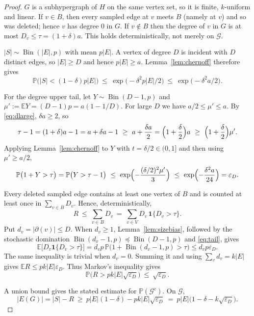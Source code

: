 \documentclass[11pt,a4paper]{amsart}
\theoremstyle{plain}
\theoremstyle{definition}
\theoremstyle{remark}
\newcommand{\VV}{V}
\newcommand{\EE}{E}
\newcommand{\PP}{\mathbb{P}}
\newcommand{\EX}{\mathbb{E}}
\newcommand{\Bin}{\operatorname{Bin}}
\newcommand{\dg}{\partial}
\begin{document}
\begin{proof}
$G$ is a subhypergraph of $H$ on the same vertex set, so it is finite, $k$-uniform and
linear. If $v\in B$, then every sampled edge at $v$ meets
$B$ (namely at $v$) and so was deleted; hence $v$ has degree $0$ in $G$. If $v\notin B$
then the degree of $v$ in $G$ is at most $D_v\le\tau=(1+\delta)a$. This holds
deterministically, not merely on $\mathcal{G}$.

$|S|\sim\Bin(|\EE|,p)$ with mean $p|\EE|$. A vertex of degree $D$ is incident with $D$
distinct edges, so $|\EE|\ge D$ and hence $p|\EE|\ge a$. Lemma~\ref{lem:chernoff}
therefore gives
\[
  \PP\bigl(|S|<(1-\delta)p|\EE|\bigr)
  \ \le\ \exp\bigl(-\delta^2p|\EE|/2\bigr)
  \ \le\ \exp\bigl(-\delta^2a/2\bigr).
\]

For the degree upper tail, let $Y\sim\Bin(D-1,p)$ and
$\mu':=\EX Y=(D-1)p=a(1-1/D)$. For large $D$ we have $a/2\le\mu'\le a$. By
\eqref{eq:dlarge}, $\delta a\ge2$, so
\[
  \tau-1=(1+\delta)a-1=a+\delta a-1\ \ge\ a+\frac{\delta a}{2}
  =\Bigl(1+\frac{\delta}{2}\Bigr)a\ \ge\ \Bigl(1+\frac{\delta}{2}\Bigr)\mu' .
\]
Applying Lemma~\ref{lem:chernoff} to $Y$ with $t=\delta/2\in(0,1]$ and then using
$\mu'\ge a/2$,
\begin{equation}
\label{eq:tail}
  \PP\bigl(1+Y>\tau\bigr)=\PP\bigl(Y>\tau-1\bigr)
  \ \le\ \exp\Bigl(-\frac{(\delta/2)^2\mu'}{3}\Bigr)
  \ \le\ \exp\Bigl(-\frac{\delta^2 a}{24}\Bigr)=\varepsilon_D .
\end{equation}

Every deleted sampled edge contains at least one vertex of $B$ and is counted at least
once in $\sum_{v\in B}D_v$. Hence, deterministically,
\[
  R\ \le\ \sum_{v\in B}D_v\ =\ \sum_{v\in \VV}D_v\,\mathbf{1}\{D_v>\tau\}.
\]
Put $d_v=|\dg(v)|\le D$. When $d_v\ge1$, Lemma~\ref{lem:sizebias}, followed by the
stochastic domination $\Bin(d_v-1,p)\preceq\Bin(D-1,p)$ and \eqref{eq:tail}, gives
\[
  \EX\bigl[D_v\mathbf{1}\{D_v>\tau\}\bigr]
  =d_vp\,\PP\bigl(1+\Bin(d_v-1,p)>\tau\bigr)
  \le d_vp\varepsilon_D .
\]
The same inequality is trivial when $d_v=0$. Summing it and using
$\sum_vd_v=k|\EE|$ gives $\EX R\le pk|\EE|\varepsilon_D$. Thus Markov's inequality
gives
\[
  \PP\bigl(R>pk|\EE|\sqrt{\varepsilon_D}\bigr)\ \le\ \sqrt{\varepsilon_D}.
\]

A union bound gives the stated estimate for $\PP(\mathcal{G}^c)$. On $\mathcal{G}$,
\[
  |E(G)|=|S|-R\ \ge\ p|\EE|(1-\delta)-pk|\EE|\sqrt{\varepsilon_D}
  \ =\ p|\EE|\bigl(1-\delta-k\sqrt{\varepsilon_D}\bigr).
\]
\end{proof}
\end{document}
